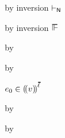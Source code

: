 {\begin{lamportproof*}
    \begin{pfproof}
        \begin{pfproof}
          by inversion $\vdash_{\mathsf{N}}$
        \end{pfproof}
        \begin{pfproof}
          by inversion $\sWSOP$
        \end{pfproof}
        \begin{pfproof}
          \qedstep
            \begin{pfproof}
              by \pfih
            \end{pfproof}
        \end{pfproof}
        \begin{pfproof}
          \qedstep
            \begin{pfproof}
              by \pfih
            \end{pfproof}
        \end{pfproof}
        \begin{pfproof}
          \qedstep
            \begin{pfproof}
              $\sexpr_0 \in \obbars{\svalue}{\sownerlist}$
            \end{pfproof}
        \end{pfproof}
    \end{pfproof}

    \begin{pfproof}
      \qedstep
        \begin{pfproof}
          by \pfih
        \end{pfproof}
    \end{pfproof}

    \begin{pfproof}
      \qedstep
        \begin{pfproof}
          by \pfih
        \end{pfproof}
    \end{pfproof}


\end{lamportproof*}}
